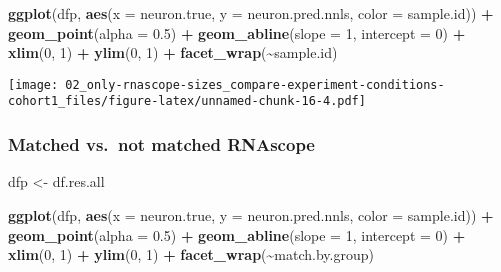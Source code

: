 \documentclass[
]{article}
\newenvironment{Shaded}{\begin{snugshade}}{\end{snugshade}}
\newcommand{\AttributeTok}[1]{\textcolor[rgb]{0.13,0.29,0.53}{#1}}
\newcommand{\DecValTok}[1]{\textcolor[rgb]{0.00,0.00,0.81}{#1}}
\newcommand{\FloatTok}[1]{\textcolor[rgb]{0.00,0.00,0.81}{#1}}
\newcommand{\FunctionTok}[1]{\textcolor[rgb]{0.13,0.29,0.53}{\textbf{#1}}}
\newcommand{\NormalTok}[1]{#1}
\newcommand{\OtherTok}[1]{\textcolor[rgb]{0.56,0.35,0.01}{#1}}
\newcommand{\SpecialCharTok}[1]{\textcolor[rgb]{0.81,0.36,0.00}{\textbf{#1}}}
\begin{document}
\begin{Shaded}
\begin{Highlighting}[]
\FunctionTok{ggplot}\NormalTok{(dfp, }\FunctionTok{aes}\NormalTok{(}\AttributeTok{x =}\NormalTok{ neuron.true, }\AttributeTok{y =}\NormalTok{ neuron.pred.nnls, }\AttributeTok{color =}\NormalTok{ sample.id)) }\SpecialCharTok{+} 
  \FunctionTok{geom\_point}\NormalTok{(}\AttributeTok{alpha =} \FloatTok{0.5}\NormalTok{) }\SpecialCharTok{+} \FunctionTok{geom\_abline}\NormalTok{(}\AttributeTok{slope =} \DecValTok{1}\NormalTok{, }\AttributeTok{intercept =} \DecValTok{0}\NormalTok{) }\SpecialCharTok{+}
  \FunctionTok{xlim}\NormalTok{(}\DecValTok{0}\NormalTok{, }\DecValTok{1}\NormalTok{) }\SpecialCharTok{+} \FunctionTok{ylim}\NormalTok{(}\DecValTok{0}\NormalTok{, }\DecValTok{1}\NormalTok{) }\SpecialCharTok{+} \FunctionTok{facet\_wrap}\NormalTok{(}\SpecialCharTok{\textasciitilde{}}\NormalTok{sample.id)}
\end{Highlighting}
\end{Shaded}

\texttt{[image: 02\_only-rnascope-sizes\_compare-experiment-conditions-cohort1\_files/figure-latex/unnamed-chunk-16-4.pdf]}

\hypertarget{matched-vs.-not-matched-rnascope}{%
\subsubsection{Matched vs.~not matched
RNAscope}\label{matched-vs.-not-matched-rnascope}}

\begin{Shaded}
\begin{Highlighting}[]
\NormalTok{dfp }\OtherTok{\textless{}{-}}\NormalTok{ df.res.all}

\FunctionTok{ggplot}\NormalTok{(dfp, }\FunctionTok{aes}\NormalTok{(}\AttributeTok{x =}\NormalTok{ neuron.true, }\AttributeTok{y =}\NormalTok{ neuron.pred.nnls, }\AttributeTok{color =}\NormalTok{ sample.id)) }\SpecialCharTok{+} \FunctionTok{geom\_point}\NormalTok{(}\AttributeTok{alpha =} \FloatTok{0.5}\NormalTok{) }\SpecialCharTok{+}
  \FunctionTok{geom\_abline}\NormalTok{(}\AttributeTok{slope =} \DecValTok{1}\NormalTok{, }\AttributeTok{intercept =} \DecValTok{0}\NormalTok{) }\SpecialCharTok{+} \FunctionTok{xlim}\NormalTok{(}\DecValTok{0}\NormalTok{, }\DecValTok{1}\NormalTok{) }\SpecialCharTok{+} \FunctionTok{ylim}\NormalTok{(}\DecValTok{0}\NormalTok{, }\DecValTok{1}\NormalTok{) }\SpecialCharTok{+} \FunctionTok{facet\_wrap}\NormalTok{(}\SpecialCharTok{\textasciitilde{}}\NormalTok{match.by.group)}
\end{Highlighting}
\end{Shaded}
\end{document}
